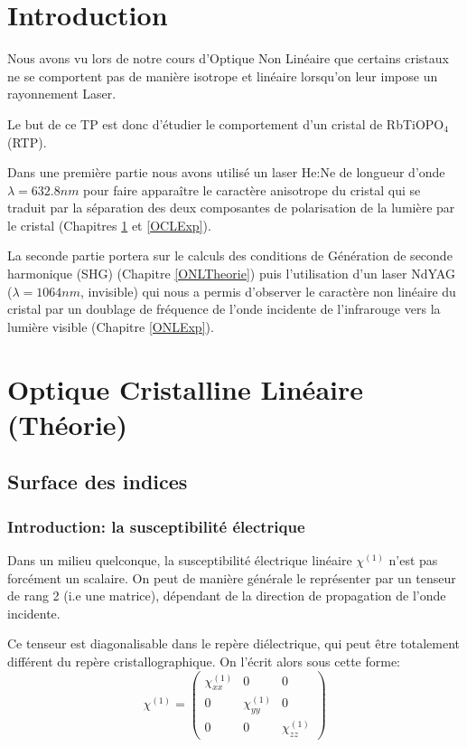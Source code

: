 \documentclass[a4paper,11pt]{report}
\begin{document}

\chapter*{Introduction} 
Nous avons vu lors de notre cours d'Optique Non Linéaire que certains cristaux ne se comportent pas de manière isotrope et linéaire lorsqu'on leur impose un rayonnement Laser.

Le but de ce TP est donc d'étudier le comportement d'un cristal de RbTiOPO$_4$ (RTP).

Dans une première partie nous avons utilisé un laser He:Ne de longueur d'onde $\lambda = 632.8nm$ pour faire apparaître le caractère anisotrope du cristal qui se traduit par la séparation des deux composantes de polarisation de la lumière par le cristal (Chapitres \ref{OCLTheorie} et \ref{OCLExp}).

La seconde partie portera sur le calculs des conditions de Génération de seconde harmonique (SHG) (Chapitre \ref{ONLTheorie}) puis l'utilisation d'un laser NdYAG ($\lambda = 1064nm$, invisible) qui nous a permis d'observer le caractère non linéaire du cristal par un doublage de fréquence de l'onde incidente de l'infrarouge vers la lumière visible (Chapitre \ref{ONLExp}).

\chapter{Optique Cristalline Linéaire (Théorie)} \label{OCLTheorie}
\section{Surface des indices}
\subsection{Introduction: la susceptibilité électrique}
Dans un milieu quelconque, la susceptibilité électrique linéaire $\chi^{(1)}$ n'est pas forcément un scalaire. On peut de manière générale le représenter par un tenseur de rang 2 (i.e une matrice), dépendant de la direction de propagation de l'onde incidente.

Ce tenseur est diagonalisable dans le repère diélectrique, qui peut être totalement différent du repère cristallographique. On l'écrit alors sous cette forme:
\[\chi^{(1)} = 
\left( \begin{matrix}
\chi^{(1)}_{xx}   & 0                 & 0 \\
0                 & \chi^{(1)}_{yy}   & 0 \\
0                 & 0                 & \chi^{(1)}_{zz}
\end{matrix}\right) \]
\end{document}
